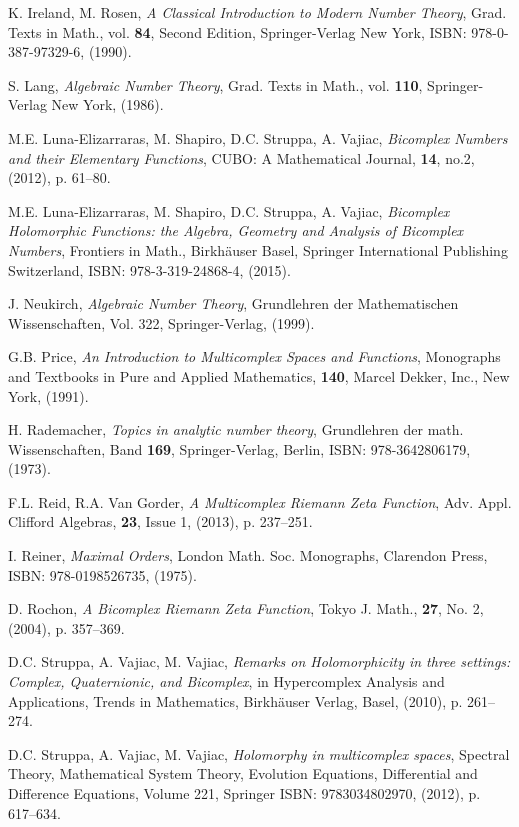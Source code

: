 \documentclass[reqno]{amsart}
\theoremstyle{plain}
\theoremstyle{definition}
\theoremstyle{remark}
\numberwithin{equation}{section}
\begin{document}
\begin{thebibliography}{999}
 K. Ireland, M. Rosen, {\em A Classical Introduction
    to Modern Number Theory}, Grad. Texts in Math., vol. {\bf 84},
  Second Edition, Springer-Verlag New York, ISBN: 978-0-387-97329-6,
  (1990).

 S. Lang, {\em Algebraic Number Theory}, Grad. Texts in
  Math., vol. {\bf 110}, Springer-Verlag New York, (1986).

 M.E. Luna-Elizarraras, M. Shapiro, D.C. Struppa,
  A. Vajiac, {\em Bicomplex Numbers and their Elementary Functions},
  CUBO: A Mathematical Journal, {\bf 14}, no.2, (2012), p. 61--80.

 M.E. Luna-Elizarraras, M. Shapiro,
  D.C. Struppa, A. Vajiac, {\em Bicomplex Holomorphic Functions: the
    Algebra, Geometry and Analysis of Bicomplex Numbers}, Frontiers in
  Math., Birkh\"auser Basel, Springer International Publishing
  Switzerland, ISBN: 978-3-319-24868-4, (2015).

 J. Neukirch, {\em Algebraic Number Theory},
  Grundlehren der Mathematischen Wissenschaften, Vol. 322,
  Springer-Verlag, (1999).

 G.B. Price, {\em An Introduction to Multicomplex
    Spaces and Functions}, Monographs and Textbooks in Pure and
  Applied Mathematics, \textbf{140}, Marcel Dekker, Inc., New York,
  (1991).

 H. Rademacher, {\em Topics in analytic number
    theory}, Grundlehren der math. Wissenschaften, Band {\bf 169},
  Springer-Verlag, Berlin, ISBN: 978-3642806179, (1973).

 F.L. Reid, R.A. Van Gorder, {\em A Multicomplex Riemann
    Zeta Function}, Adv. Appl. Clifford Algebras, {\bf 23}, Issue 1,
  (2013), p. 237--251.

 I. Reiner, {\em Maximal Orders}, London
  Math. Soc. Monographs, Clarendon Press, ISBN:
  978-0198526735, (1975).

 D. Rochon, {\em A Bicomplex Riemann Zeta
    Function}, Tokyo J. Math., \textbf{27}, No. 2, (2004),
  p. 357--369.

 D.C. Struppa, A. Vajiac, M. Vajiac, {\em Remarks
    on Holomorphicity in three settings: Complex, Quaternionic, and
    Bicomplex}, in Hypercomplex Analysis and Applications, Trends in
  Mathematics, Birkh\"auser Verlag, Basel, (2010), p. 261--274.

 D.C. Struppa, A. Vajiac, M. Vajiac, {\em
     Holomorphy in multicomplex spaces}, Spectral Theory, Mathematical
  System Theory, Evolution Equations, Differential and Difference
  Equations, Volume 221, Springer ISBN: 9783034802970, (2012),
  p. 617--634.

\end{thebibliography}
\end{document}

